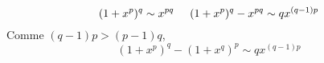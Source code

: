 \begin{displaymath}
 (1+x^p)^q \sim x^{pq}\hspace{0.5cm} (1+x^p)^q - x^{pq} \sim qx^{(q-1)p}
\end{displaymath}
Comme $(q-1)p > (p-1)q$,
\begin{displaymath}
 (1+x^p)^q - (1+x^q)^p \sim qx^{(q-1)p} 
\end{displaymath}
